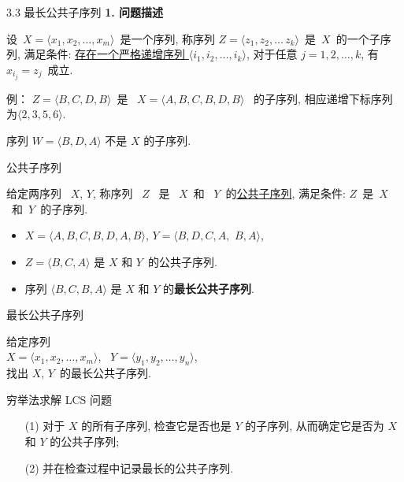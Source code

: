 \documentclass[fontset=fandol,UTF8,fleqn]{beamer}
\begin{document}
\begin{frame}{3.3 最长公共子序列}
\textbf{1. 问题描述}  
\begin{definition}[子序列]
  设~$X =\langle x_1, x_2,\ldots,x_m \rangle$~是一个序列, 称序列 $Z = \langle z_1, z_2,\ldots \,z_k\rangle$~是~$X$~的一个子序列, 满足条件: \underline{存在一个严格递增序列 $\langle i_1,i_2,\ldots, i_k\rangle$}, 对于任意 $j = 1, 2, \ldots, k$, 有~$x_{i_j}
  = z_j$~成立.  
\end{definition}\pause
例： $Z = \langle B, C, D, B\rangle$~是~ $X = \langle A, B, C, B, D, B\rangle$~
的子序列, 相应递增下标序列为$\langle 2, 3, 5, 6\rangle$.  \pause

序列 $W=\langle B, D, A \rangle$ 不是 $X$ 的子序列.  \pause
\end{frame}

\begin{frame}{公共子序列}
\begin{definition}[公共子序列] 给定两序列~ $X$, $Y$, 称序列 ~$Z$ ~是~ $X$~和~ $Y$~的\underline{公共子序列}, 满足条件: $Z$~是~$X$ ~和~$Y$~的子序列. 
\end{definition}
  \begin{itemize}[<+-|alert@+>]
\item $X =\langle A, B, C, B, D, A, B\rangle$, $Y =\langle B, D, C, A, $ $B, A\rangle$,    
\item $Z=\langle B, C, A\rangle$ 是 $X$ 和 $Y$~的公共子序列.  
\item 序列 $\langle B, C, B, A\rangle$ 是 $X$ 和 $Y$ 的\textbf{最长公共子序列}. 
\end{itemize}
\end{frame}

\begin{frame}{最长公共子序列}  

\begin{definition}
给定序列 \\
$X =\langle x_1, x_2,\ldots,x_m \rangle$,  ~$Y =\langle y_1, y_2,\ldots,y_n \rangle$, \\
找出 $X$, $Y$~的最长公共子序列. 
\end{definition}
\end{frame}

\begin{frame}{穷举法求解 LCS 问题}
  \begin{itemize}[<+-|alert@+>]
\item[(1)] 对于 $X$ 的所有子序列, 检查它是否也是 $Y$ 的子序列, 从而确定它是否为 $X$
  和 $Y$ 的公共子序列;  
\item[(2)]  并在检查过程中记录最长的公共子序列. 
\end{itemize}
\end{frame}
\end{document}
